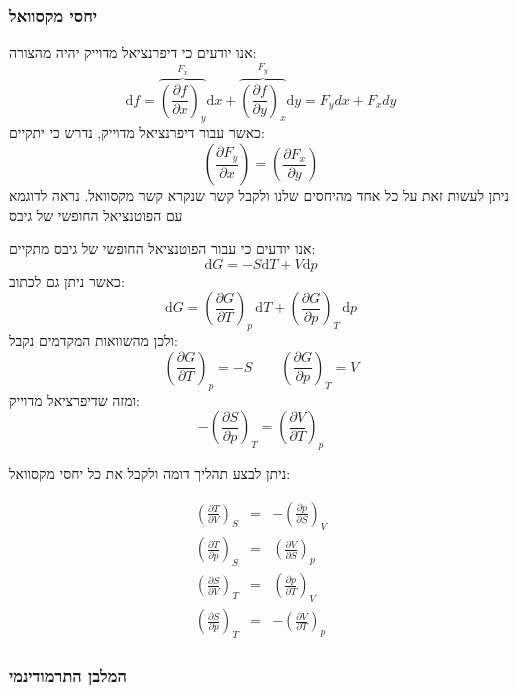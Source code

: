 \documentclass{tstextbook}
\begin{document}
\subsubsection{יחסי מקסוואל}

אנו יודעים כי דיפרנציאל מדוייק יהיה מהצורה:
$$\mathrm{d}f=\overbrace{ \left({\frac{\partial f}{\partial x}}\right)_{y} }^{ F_{x} }\mathrm{d}x+\overbrace{ \left({\frac{\partial f}{\partial y}}\right)_{x} }^{ F_{y} }\mathrm{d}y=F_{y}dx+F_{x}dy$$
כאשר עבור דיפרנציאל מדוייק, נדרש כי יתקיים:
$$\left({\frac{\partial F_{y}}{\partial x}}\right)=\left({\frac{\partial F_{x}}{\partial y}}\right)$$
ניתן לעשות זאת על כל אחד מהיחסים שלנו ולקבל קשר שנקרא קשר מקסוואל. נראה לדוגמא עם הפוטנציאל החופשי של גיבס

\begin{example}
אנו יודעים כי עבור הפוטנציאל החופשי של גיבס מתקיים:
$$\mathrm{d}G=-S\mathrm{d}T+V\mathrm{d}p$$
כאשר ניתן גם לכתוב:
$$\mathrm{d}G=\left({\frac{\partial G}{\partial T}}\right)_{p}\,\mathrm{d}T+\left({\frac{\partial G}{\partial p}}\right)_{T}\,\mathrm{d}p$$
ולכן מהשוואות המקדמים נקבל:
$$\left({\frac{\partial G}{\partial T}}\right)_{p} = -S\qquad \left( \frac{\partial G}{\partial p}  \right)_{T}=V$$
ומזה שדיפרציאל מדוייק:
$$-\left({\frac{\partial S}{\partial p}}\right)_{T}=\left({\frac{\partial V}{\partial T}}\right)_{p}$$

\end{example}
ניתן לבצע תהליך דומה ולקבל את כל יחסי מקסוואל:

\begin{proposition}
$$\begin{gather}{{\left(\frac{\partial T}{\partial V}\right)_{S}}}&{{=}}&{{-\left(\frac{\partial p}{\partial S}\right)_{V}}}\\ {{\left(\frac{\partial T}{\partial p}\right)_{S}}}&{{=}}&{{\left(\frac{\partial V}{\partial S}\right)_{p}}}\\ {{\left(\frac{\partial S}{\partial V}\right)_{T}}}&{{=}}&{{\left(\frac{\partial p}{\partial T}\right)_{V}}}\\ {{\left(\frac{\partial S}{\partial p}\right)_{T}}}&{{=}}&{{-\left(\frac{\partial V}{\partial T}\right)_{p}}}\end{gather}$$

\end{proposition}
\subsubsection{המלבן התרמודינמי}
\end{document}
